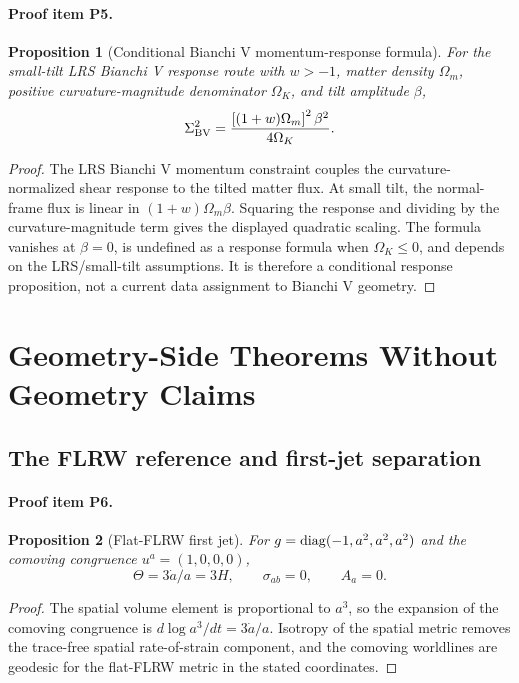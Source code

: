\documentclass[11pt]{article}
\newtheorem{proposition}{Proposition}
\begin{document}
\paragraph{Proof item P5.}
\begin{proposition}[Conditional Bianchi V momentum-response formula]
For the small-tilt LRS Bianchi V response route with \(w>-1\), matter density \(\Omega_m\), positive curvature-magnitude denominator \(\Omega_K\), and tilt amplitude \(\beta\),
\[
  \Sigma^2_{\rm BV}
  =
  \frac{\left[(1+w)\Omega_m\right]^2\beta^2}{4\Omega_K}.
\]
\end{proposition}
\begin{proof}
The LRS Bianchi V momentum constraint couples the curvature-normalized shear response to the tilted matter flux.  At small tilt, the normal-frame flux is linear in \((1+w)\Omega_m\beta\).  Squaring the response and dividing by the curvature-magnitude term gives the displayed quadratic scaling.  The formula vanishes at \(\beta=0\), is undefined as a response formula when \(\Omega_K\le0\), and depends on the LRS/small-tilt assumptions.  It is therefore a conditional response proposition, not a current data assignment to Bianchi V geometry.
\end{proof}

\section{Geometry-Side Theorems Without Geometry Claims}
\subsection{The FLRW reference and first-jet separation}
\paragraph{Proof item P6.}
\begin{proposition}[Flat-FLRW first jet]
For \(g={\rm diag}(-1,a^2,a^2,a^2)\) and the comoving congruence \(u^a=(1,0,0,0)\),
\[
  \Theta=3\dot a/a=3H,\qquad \sigma_{ab}=0,\qquad A_a=0.
\]
\end{proposition}
\begin{proof}
The spatial volume element is proportional to \(a^3\), so the expansion of the comoving congruence is \(d\log a^3/dt=3\dot a/a\).  Isotropy of the spatial metric removes the trace-free spatial rate-of-strain component, and the comoving worldlines are geodesic for the flat-FLRW metric in the stated coordinates.
\end{proof}
\end{document}
